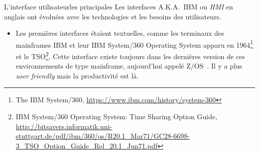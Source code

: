 \documentclass{beamer}
\begin{document}
    \begin{frame}{L'interface utilisateur}{les principales}
        Les interfaces A.K.A.\ IHM ou \textit{HMI} en anglais ont évoluées avec les technologies et les besoins des utilisateurs.
        \begin{itemize}
            \item Les premières interfaces étaient textuelles, comme les terminaux des mainframes IBM et leur IBM System/360 Operating System apparu en 1964\footnote{The IBM System/360, \url{https://www.ibm.com/history/system-360}} et le TSO\footnote{IBM System/360 Operating System: Time Sharing Option Guide, \url{http://bitsavers.informatik.uni-stuttgart.de/pdf/ibm/360/os/R20.1_Mar71/GC28-6698-3_TSO_Option_Guide_Rel_20.1_Jun71.pdf}}.
            Cette interface existe toujours dans les dernières version de ces environnements de type mainframe, aujourd'hui appelé Z/OS~.
            Il y a plus \textit{user friendly} mais la productivité est là.
        \end{itemize}
    \end{frame}
\end{document}
